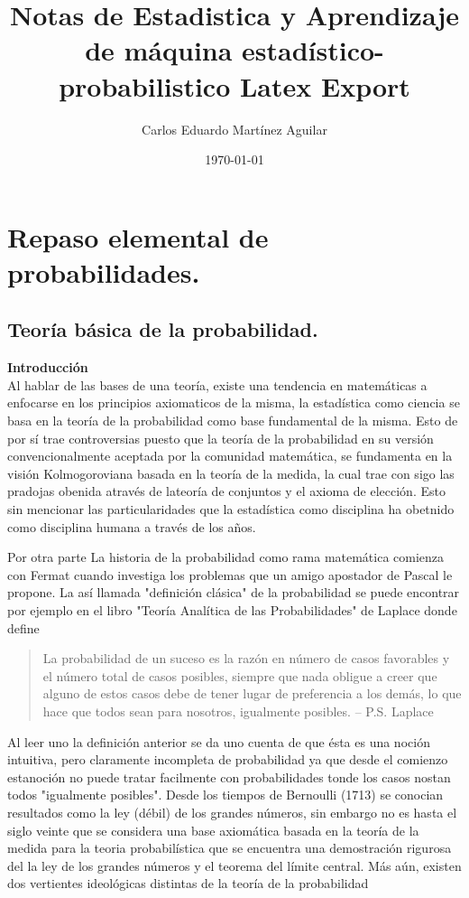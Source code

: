 \documentclass[letterpaper]{book}
\author{Carlos Eduardo Martínez Aguilar}
\date{\today}
\title{Notas de Estadistica y Aprendizaje de máquina estadístico-probabilistico Latex Export}
\begin{document}
\maketitle
\tableofcontents

\part{Repaso elemental de probabilidades.}
\label{sec:org35c232f}

\chapter{Teoría básica de la probabilidad.}
\label{sec:org9610b27}

\noindent \textbf{\huge Introducción}
\vspace{0.5cm}\\
\noindent Al hablar de las bases de una teoría, existe una tendencia en matemáticas a enfocarse en los principios axiomaticos de la misma, la estadística como ciencia se basa en la teoría de la probabilidad como base fundamental de la misma. Esto de por sí trae controversias puesto que la teoría de la probabilidad en su versión convencionalmente aceptada por la comunidad matemática, se fundamenta en la visión Kolmogoroviana basada en la teoría de la medida, la cual trae con sigo las pradojas obenida através de lateoría de conjuntos y el axioma de elección. Esto sin mencionar las particularidades que la estadística como disciplina ha obetnido como disciplina humana a través de los años.

Por otra parte La historia de la probabilidad como rama matemática comienza con Fermat cuando investiga los problemas que un amigo apostador de Pascal le propone. La así llamada "definición clásica" de la probabilidad se puede encontrar por ejemplo en el libro "Teoría Analítica de las Probabilidades" de Laplace donde define

\begin{quote}
La probabilidad de un suceso es la razón en número de casos favorables y el número total de casos posibles, siempre que nada obligue a creer que alguno de estos casos debe de tener lugar de preferencia a los demás, lo que hace que todos sean para nosotros, igualmente posibles. -- P.S. Laplace
\end{quote}

Al leer uno la definición anterior se da uno cuenta de que ésta es una noción intuitiva, pero claramente incompleta de probabilidad ya que desde el comienzo estanoción no puede tratar facilmente con probabilidades tonde los casos nostan todos "igualmente posibles". Desde los tiempos de Bernoulli (1713) se conocian resultados como la ley (débil) de los grandes números, sin embargo no es hasta el siglo veinte que se considera una base axiomática basada en la teoría de la medida para la teoria probabilística que se encuentra una demostración rigurosa del la ley de los grandes números y el teorema del límite central. Más aún, existen dos vertientes ideológicas distintas de la teoría de la probabilidad
\end{document}
